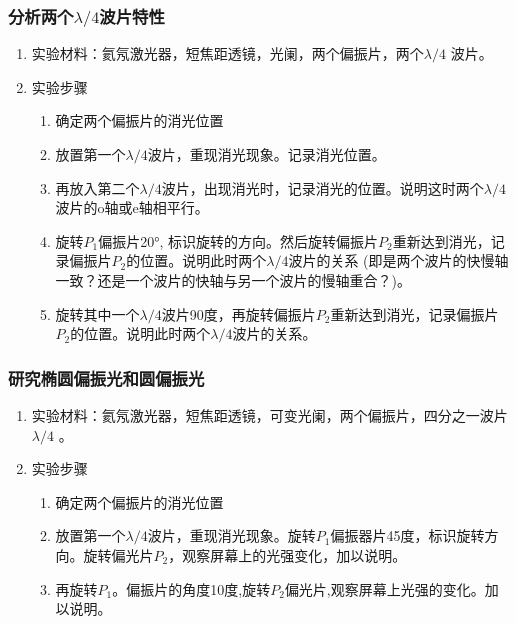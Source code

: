 \documentclass[dvipsnames, svgnames,a4paper,11pt]{article}
\begin{document}
\subsubsection{分析两个$\lambda/4$波片特性}
\begin{enumerate}
	
	\item 实验材料：氦氖激光器，短焦距透镜，光阑，两个偏振片，两个$\lambda/4$ 波片。
	\item 实验步骤
   \begin{enumerate}
		\item  确定两个偏振片的消光位置
		\item 放置第一个$\lambda/4$波片，重现消光现象。记录消光位置。
		\item  再放入第二个$\lambda/4$波片，出现消光时，记录消光的位置。说明这时两个$\lambda/4$波片的o轴或e轴相平行。
		
		\item  旋转$P_1$偏振片20°, 标识旋转的方向。然后旋转偏振片$P_2$重新达到消光，记录偏振片$P_2$的位置。说明此时两个$\lambda/4$波片的关系 (即是两个波片的快慢轴一致？还是一个波片的快轴与另一个波片的慢轴重合？)。
		
		\item  旋转其中一个$\lambda/4$波片90度，再旋转偏振片$P_2$重新达到消光，记录偏振片$P_2$的位置。说明此时两个$\lambda/4$波片的关系。
		
	\end{enumerate}




\end{enumerate}
\subsubsection{研究椭圆偏振光和圆偏振光}
\begin{enumerate}
	
	\item 实验材料：氦氖激光器，短焦距透镜，可变光阑，两个偏振片，四分之一波片$\lambda/4$ 。
	\item 实验步骤
   \begin{enumerate}
		\item  确定两个偏振片的消光位置
		\item 放置第一个$\lambda/4$波片，重现消光现象。旋转$P_1$偏振器片45度，标识旋转方向。旋转偏光片$P_2$，观察屏幕上的光强变化，加以说明。

		\item  再旋转$P_1$。偏振片的角度10度,旋转$P_2$偏光片,观察屏幕上光强的变化。加以说明。
		
		
	\end{enumerate}




\end{enumerate}
\end{document}
